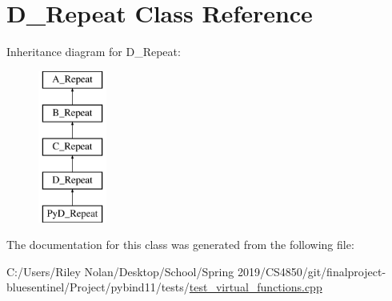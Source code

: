\hypertarget{class_d___repeat}{}\section{D\+\_\+\+Repeat Class Reference}
\label{class_d___repeat}
Inheritance diagram for D\+\_\+\+Repeat\+:\begin{figure}[H]
\begin{center}
\leavevmode
\includegraphics[height=5.000000cm]{class_d___repeat}
\end{center}
\end{figure}


The documentation for this class was generated from the following file\+:\begin{DoxyCompactItemize}
\item 
C\+:/\+Users/\+Riley Nolan/\+Desktop/\+School/\+Spring 2019/\+C\+S4850/git/finalproject-\/bluesentinel/\+Project/pybind11/tests/\mbox{\hyperlink{test__virtual__functions_8cpp}{test\+\_\+virtual\+\_\+functions.\+cpp}}\end{DoxyCompactItemize}
